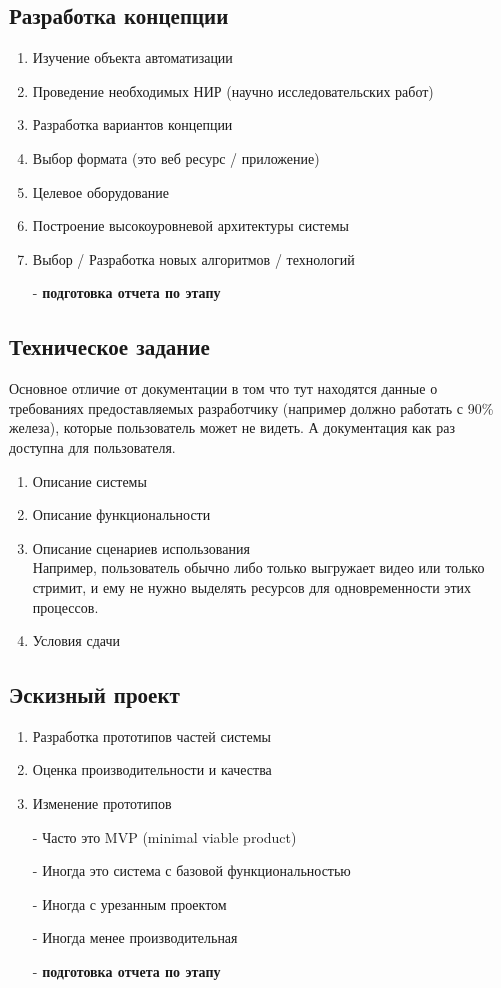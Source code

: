 \documentclass[12pt; a4paper]{book}
\begin{document}
\subsection{Разработка концепции}
\begin{enumerate}
\item Изучение объекта автоматизации
\item Проведение необходимых НИР (научно исследовательских работ)
\item Разработка вариантов концепции
\item Выбор формата (это веб ресурс / приложение)
\item Целевое оборудование
\item Построение высокоуровневой архитектуры системы
\item Выбор / Разработка новых алгоритмов / технологий
\item[-] \textbf{подготовка отчета по этапу}
\end{enumerate}

\subsection{Техническое задание}
Основное отличие от документации в том что тут находятся данные о требованиях
предоставляемых разработчику (например должно работать с 90\% железа), которые пользователь может не видеть. А документация как раз доступна для пользователя.
\begin{enumerate}
\item Описание системы
\item Описание функциональности
\item \hangindent=6cm  \noindent Описание сценариев использования\\ {\footnotesize Например, пользователь обычно либо только выгружает видео или только стримит, и ему не нужно выделять ресурсов для одновременности этих процессов.}
\item Условия сдачи
\end{enumerate}

\subsection{Эскизный проект}
\begin{enumerate}
\item Разработка прототипов частей системы
\item Оценка производительности и качества
\item Изменение прототипов
\item[-] Часто это MVP (minimal viable product)
\item[-] Иногда это система с базовой функциональностью
\item[-] Иногда с урезанным проектом
\item[-] Иногда менее производительная
\item[-] \textbf{подготовка отчета по этапу}
\end{enumerate}
\end{document}
